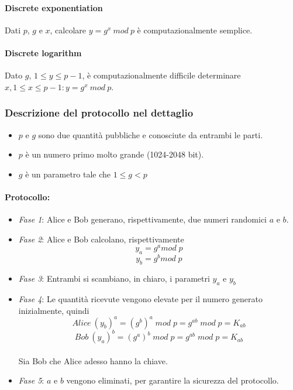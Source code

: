 \documentclass[a4paper,12pt]{article}
\begin{document}
\paragraph{Discrete exponentiation} Dati $p$, $g$ e $x$, calcolare $y = g^x\ mod\ p$ è computazionalmente semplice.

\paragraph{Discrete logarithm} Dato $g$, $1 \leq y \leq p-1$, è computazionalmente difficile determinare  $x, 1 \leq x \leq p-1 : y = g^x\ mod\ p$.

\subsubsection{Descrizione del protocollo nel dettaglio}
\begin{itemize}
	\item $p$ e $g$ sono due quantità pubbliche e conosciute da entrambi le parti.
	\item $p$ è un numero primo molto grande (1024-2048 bit).
	\item $g$ è un parametro tale che $1 \leq g < p$
\end{itemize}
\paragraph{Protocollo:}
\begin{itemize}
	\item \textit{Fase 1}: Alice e Bob generano, rispettivamente, due numeri randomici $a$ e $b$.
	\item \textit{Fase 2}: Alice e Bob calcolano, rispettivamente $$y_a = g^a mod\;p$$ $$y_b = g^b mod\;p$$
	\item \textit{Fase 3}: Entrambi si scambiano, in chiaro, i parametri $y_a$ e $y_b$
	\item \textit{Fase 4}: Le quantità ricevute vengono elevate per il numero generato inizialmente, quindi $$Alice\:(y_b)^a = (g^b)^a\;mod\;p = g^{ab}\;mod\;p = K_{ab}$$ $$Bob\:(y_a)^b = (g^a)^b\;mod\;p = g^{ab}\;mod\;p = K_{ab}$$ \\
	Sia Bob che Alice adesso hanno la chiave.
	\item \textit{Fase 5}: $a$ e $b$ vengono eliminati, per garantire la sicurezza del protocollo.
\end{itemize}
\end{document}
